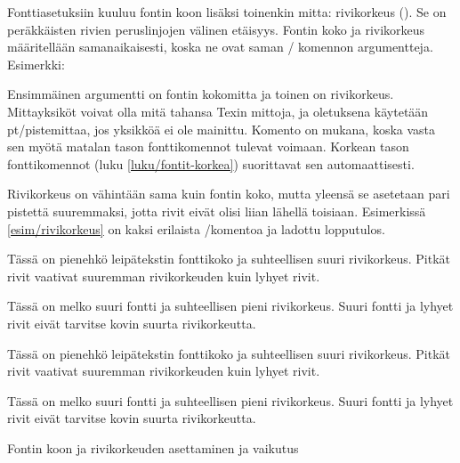 Fonttiasetuksiin kuuluu fontin koon lisäksi toinenkin mitta: rivikorkeus
(). Se on peräkkäisten rivien peruslinjojen välinen
etäisyys. Fontin koko ja rivikorkeus määritellään samanaikaisesti, koska
ne ovat saman \-/ komennon argumentteja. Esimerkki:

\begin{koodilohkosis}
\fontsize{10bp}{12bp} \selectfont
\end{koodilohkosis}

\noindent
Ensimmäinen argumentti on fontin kokomitta ja toinen on rivikorkeus.
Mittayksiköt voivat olla mitä tahansa Texin mittoja, ja oletuksena
käytetään pt\-/pistemittaa, jos yksikköä ei ole mainittu. Komento
 on mukana, koska vasta sen myötä matalan tason
fonttikomennot tulevat voimaan. Korkean tason fonttikomennot (luku
\ref{luku/fontit-korkea}) suorittavat sen automaattisesti.

Rivikorkeus on vähintään sama kuin fontin koko, mutta yleensä se
asetetaan pari pistettä suuremmaksi, jotta rivit eivät olisi liian
lähellä toisiaan. Esimerkissä \ref{esim/rivikorkeus} on kaksi erilaista
\-/komentoa ja ladottu lopputulos.

\begin{esimerkki*}

\begin{koodilohko}
\fontsize{8bp}{11bp}\selectfont Tässä on pienehkö leipätekstin
fonttikoko ja suhteellisen suuri rivikorkeus. Pitkät rivit vaativat
suuremman rivikorkeuden kuin lyhyet rivit.

\fontsize{16bp}{17bp}\selectfont Tässä on melko suuri fontti ja
suhteellisen pieni rivikorkeus. Suuri fontti ja lyhyet rivit eivät
tarvitse kovin suurta rivikorkeutta.
\end{koodilohko}
  \begin{tulos}
    \fontsize{8bp}{11bp}\selectfont Tässä on pienehkö leipätekstin
    fonttikoko ja suhteellisen suuri rivikorkeus. Pitkät rivit vaativat
    suuremman rivikorkeuden kuin lyhyet rivit.

    \fontsize{16bp}{17bp}\selectfont Tässä on melko suuri fontti ja
    suhteellisen pieni rivikorkeus. Suuri fontti ja lyhyet rivit eivät
    tarvitse kovin suurta rivikorkeutta.
  \end{tulos}
  \caption{Fontin koon ja rivikorkeuden asettaminen ja vaikutus}
  \label{esim/rivikorkeus}
\end{esimerkki*}

